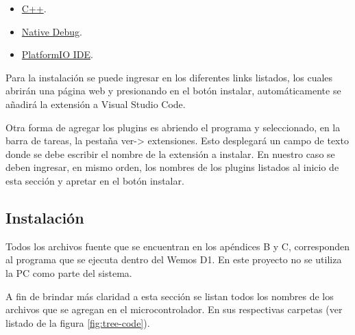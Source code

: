         \begin{itemize}
            \item \href{https://marketplace.visualstudio.com/items?itemName=ms-vscode.cpptools}{C++}.
            \item \href{https://marketplace.visualstudio.com/items?itemName=webfreak.debug}{Native Debug}.
            \item \href{https://marketplace.visualstudio.com/items?itemName=platformio.platformio-ide}{PlatformIO IDE}.
        \end{itemize}
        
        Para la instalación se puede ingresar en los diferentes links listados, los cuales abrirán una página web y presionando en el botón instalar, automáticamente se añadirá la extensión a Visual Studio Code.
        
        Otra forma de agregar los plugins es abriendo el programa y seleccionado, en la barra de tareas, la pestaña ver-> extensiones. Esto desplegará un campo de texto donde se debe escribir el nombre de la extensión a instalar. En nuestro caso se deben ingresar, en mismo orden, los nombres de los plugins listados al inicio de esta sección y apretar en el botón instalar.
    
        
    \subsection{Instalación}
    Todos los archivos fuente que se encuentran en los apéndices B y C, corresponden al programa que se ejecuta dentro del Wemos D1. En este proyecto no se utiliza la PC como parte del sistema.
    
    A fin de brindar más claridad a esta sección se listan todos los nombres de los archivos que se agregan en el microcontrolador. En sus respectivas carpetas (ver listado de la figura \ref{fig:tree-code}).
    
